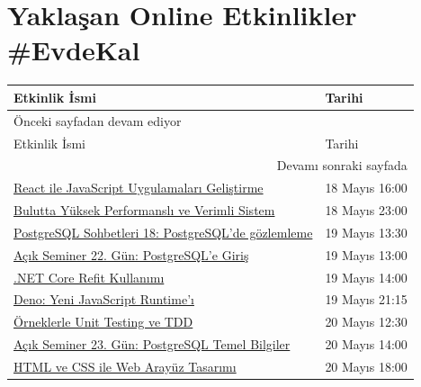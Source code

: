 \documentclass[11pt]{article}
\begin{document}
\section{Yaklaşan Online Etkinlikler \#EvdeKal}
\label{sec:org3f9c437}
\begin{longtable}{|p{9.5cm}|l|}
\hline
Etkinlik İsmi & Tarihi\\
\hline
\endfirsthead
\multicolumn{2}{l}{Önceki sayfadan devam ediyor} \\
\hline

Etkinlik İsmi & Tarihi \\

\hline
\endhead
\hline\multicolumn{2}{r}{Devamı sonraki sayfada} \\
\endfoot
\endlastfoot
\hline
\href{https://kommunity.com/bilge-adam-teknoloji/events/react-ile-javascript-uygulamalari-gelistirme-b70b2cb9}{React ile JavaScript Uygulamaları Geliştirme} & 18 Mayıs 16:00\\
\href{https://kommunity.com/cloud-and-serverless-turkey/events/ramazan-ozel-8-bulutta-yuksek-performansli-ve-verimli-sistem-tasarlama-a72398fb}{Bulutta Yüksek Performanslı ve Verimli Sistem} & 18 Mayıs 23:00\\
\href{https://kommunity.com/pgtr/events/postgresql-sohbetleri-18-postgresqlde-gozlemleme-monitoring-d78fab87}{PostgreSQL Sohbetleri 18: PostgreSQL'de gözlemleme} & 19 Mayıs 13:30\\
\href{https://kommunity.com/tracikkaynak/events/acik-seminer-22-gun-postgresql-53dbbb44}{Açık Seminer 22. Gün: PostgreSQL'e Giriş} & 19 Mayıs 13:00\\
\href{https://kommunity.com/bilge-adam-teknoloji/events/net-core-refit-kullanimi-f9c2215b}{.NET Core Refit Kullanımı} & 19 Mayıs 14:00\\
\href{https://kommunity.com/jstanbul/events/deno-yeni-javascript-runtimei-3bc240d7}{Deno: Yeni JavaScript Runtime'ı} & 19 Mayıs 21:15\\
\href{https://kommunity.com/teknopark-istanbul-yazilimci-bulusmalari/events/orneklerle-unit-testing-ve-tdd-3f5cc824}{Örneklerle Unit Testing ve TDD} & 20 Mayıs 12:30\\
\href{https://kommunity.com/tracikkaynak/events/acik-seminer-23-gun-postgressql-temel-bilgiler-b31504bc}{Açık Seminer 23. Gün: PostgreSQL Temel Bilgiler} & 20 Mayıs 14:00\\
\href{https://kommunity.com/bilge-adam-teknoloji/events/html-ve-css-ile-web-arayuz-tasarimi-48e9156f}{HTML ve CSS ile Web Arayüz Tasarımı} & 20 Mayıs 18:00\\

\end{longtable}
\end{document}
